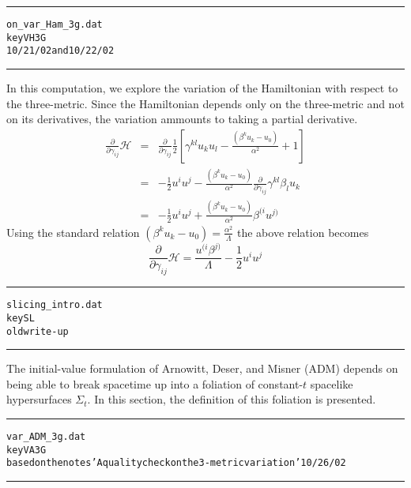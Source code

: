 \documentclass[12pt]{article}
\begin{document}
\clearpage
\vspace{5mm}
\hrule
\begin{alltt}
  on_var_Ham_3g.dat
  key VH3G
  10/21/02 and 10/22/02
\end{alltt}
\hrule
\vspace{5mm}

In this computation, we explore the variation of the
Hamiltonian with respect to the three-metric. Since
the Hamiltonian depends only on the three-metric and
not on its derivatives, the variation ammounts to
taking a partial derivative.
\begin{eqnarray}\label{VH3G_1}
\frac{\partial }{\partial {\gamma}_{i j}} \mathcal{H} & = & \frac{\partial }{\partial {\gamma}_{i j}} \frac{1}{2}
\left[ {\gamma}^{k l} {u}_{k} {u}_{l} -
\frac{ \left( {\beta}^{k} {u}_{k} - {u}_{0} \right) }
{ \alpha ^ 2 }
+ 1
\right] \nonumber \\
& = &
- \frac{1}{2} {u}^{i} {u}^{j}
- \frac{ \left( {\beta}^{k} {u}_{k} - {u}_{0} \right) }
{ \alpha ^2 }
\frac{\partial }{\partial {\gamma}_{i j}} {\gamma}^{k l} {\beta}_{l} {u}_{k} \nonumber \\
& = &
- \frac{1}{2} {u}^{i} {u}^{j}
+ \frac{ \left( {\beta}^{k} {u}_{k} - {u}_{0} \right) }
{ \alpha ^2 }
{\beta}^{(i} {u}^{j)}
\end{eqnarray}
Using the standard relation $ \left( {\beta}^{k} {u}_{k} - {u}_{0} \right)
= \frac{ \alpha ^2 }{ \Lambda } $ the above relation becomes
\begin{equation}\label{VH3G_2}
\frac{\partial }{\partial {\gamma}_{i j}} \mathcal{H} = \frac{ {u}^{(i} {\beta}^{j)} }{ \Lambda }
- \frac{1}{2} {u}^{i} {u}^{j}
\end{equation}



\clearpage
\vspace{5mm}
\hrule
\begin{alltt}
  slicing_intro.dat
  key SL
  old write-up
\end{alltt}
\hrule
\vspace{5mm}

The initial-value formulation of Arnowitt, Deser, and Misner (ADM) depends on
being able to break spacetime up into a foliation of constant-$t$ spacelike
hypersurfaces $\Sigma_t$. In this section, the definition of this foliation
is presented.
\clearpage
\vspace{5mm}
\hrule
\begin{alltt}
  var_ADM_3g.dat
  key VA3G
  based on the notes 'A quality check on the 3-metric variation' 10/26/02
\end{alltt}
\hrule
\vspace{5mm}
\end{document}

